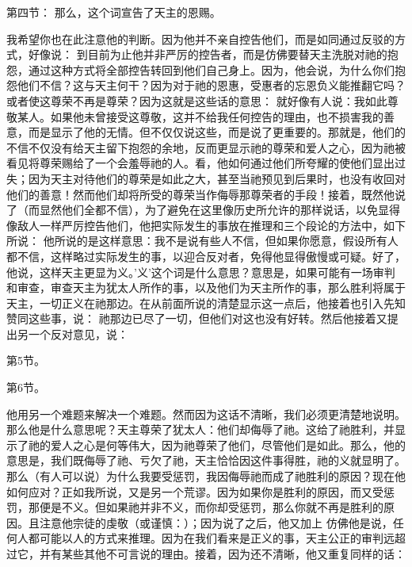 第四节： 那么，这个词宣告了天主的恩赐。\par

我希望你也在此注意他的判断。因为他并不亲自控告他们，而是如同通过反驳的方式，好像说： 到目前为止他并非严厉的控告者，而是仿佛要替天主洗脱对祂的抱怨，通过这种方式将全部控告转回到他们自己身上。因为，他会说，为什么你们抱怨他们不信？这与天主何干？因为对于祂的恩惠，受惠者的忘恩负义能推翻它吗？或者使这尊荣不再是尊荣？因为这就是这些话的意思：  就好像有人说：我如此尊敬某人。如果他未曾接受这尊敬，这并不给我任何控告的理由，也不损害我的善意，而是显示了他的无情。但不仅仅说这些，而是说了更重要的。那就是，他们的不信不仅没有给天主留下抱怨的余地，反而更显示祂的尊荣和爱人之心，因为祂被看见将尊荣赐给了一个会羞辱祂的人。看，他如何通过他们所夸耀的使他们显出过失；因为天主对待他们的尊荣是如此之大，甚至当祂预见到后果时，也没有收回对他们的善意！然而他们却将所受的尊荣当作侮辱那尊荣者的手段！接着，既然他说了（而显然他们全都不信），为了避免在这里像历史所允许的那样说话，以免显得像敌人一样严厉控告他们，他把实际发生的事放在推理和三个段论的方法中，如下所说： 他所说的是这样意思：我不是说有些人不信，但如果你愿意，假设所有人都不信，这样略过实际发生的事，以迎合反对者，免得他显得傲慢或可疑。好了，他说，这样天主更显为义。'义'这个词是什么意思？意思是，如果可能有一场审判和审查，审查天主为犹太人所作的事，以及他们为天主所作的事，那么胜利将属于天主，一切正义在祂那边。在从前面所说的清楚显示这一点后，他接着也引入先知赞同这些事，说：  祂那边已尽了一切，但他们对这也没有好转。然后他接着又提出另一个反对意见，说：\par

第5节。 \par

第6节。 \par

他用另一个难题来解决一个难题。然而因为这话不清晰，我们必须更清楚地说明。那么他是什么意思呢？天主尊荣了犹太人：他们却侮辱了祂。这给了祂胜利，并显示了祂的爱人之心是何等伟大，因为祂尊荣了他们，尽管他们是如此。那么，他的意思是，我们既侮辱了祂、亏欠了祂，天主恰恰因这件事得胜，祂的义就显明了。那么（有人可以说）为什么我要受惩罚，我因侮辱祂而成了祂胜利的原因？现在他如何应对？正如我所说，又是另一个荒谬。因为如果你是胜利的原因，而又受惩罚，那便是不义。但如果祂并非不义，而你却受惩罚，那么你就不再是胜利的原因。且注意他宗徒的虔敬（或谨慎：）；因为说了之后，他又加上 仿佛他是说，任何人都可能以人的方式来推理。因为在我们看来是正义的事，天主公正的审判远超过它，并有某些其他不可言说的理由。接着，因为还不清晰，他又重复同样的话：\par

